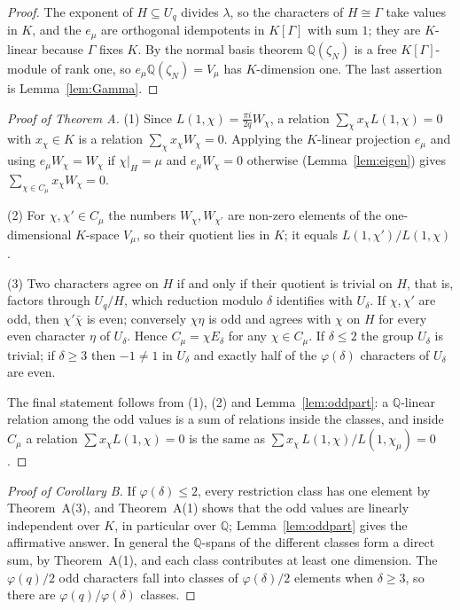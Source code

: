 \documentclass[11pt]{amsart}
\theoremstyle{definition}
\theoremstyle{remark}
\providecommand{\Q}{\mathbb Q}
\numberwithin{equation}{section}
\begin{document}
\begin{proof}
The exponent of $H\subseteq U_q$ divides $\lambda$, so the characters of $H\cong\Gamma$ take values in $K$, and the $e_\mu$ are orthogonal idempotents in $K[\Gamma]$ with sum $1$; they are $K$-linear because $\Gamma$ fixes $K$.
By the normal basis theorem $\Q(\zeta_N)$ is a free $K[\Gamma]$-module of rank one, so $e_\mu\Q(\zeta_N)=V_\mu$ has $K$-dimension one.
The last assertion is Lemma~\ref{lem:Gamma}.
\end{proof}

\begin{proof}[Proof of Theorem A]
(1) Since $L(1,\chi)=\frac{\pi i}{2q}W_\chi$, a relation $\sum_\chi x_\chi L(1,\chi)=0$ with $x_\chi\in K$ is a relation $\sum_\chi x_\chi W_\chi=0$.
Applying the $K$-linear projection $e_\mu$ and using $e_\mu W_\chi=W_\chi$ if $\chi|_H=\mu$ and $e_\mu W_\chi=0$ otherwise (Lemma~\ref{lem:eigen}) gives $\sum_{\chi\in C_\mu}x_\chi W_\chi=0$.

(2) For $\chi,\chi'\in C_\mu$ the numbers $W_\chi,W_{\chi'}$ are non-zero elements of the one-dimensional $K$-space $V_\mu$, so their quotient lies in $K$; it equals $L(1,\chi')/L(1,\chi)$.

(3) Two characters agree on $H$ if and only if their quotient is trivial on $H$, that is, factors through $U_q/H$, which reduction modulo $\delta$ identifies with $U_\delta$.
If $\chi,\chi'$ are odd, then $\chi'\bar\chi$ is even; conversely $\chi\eta$ is odd and agrees with $\chi$ on $H$ for every even character $\eta$ of $U_\delta$.
Hence $C_\mu=\chi E_\delta$ for any $\chi\in C_\mu$.
If $\delta\le2$ the group $U_\delta$ is trivial; if $\delta\ge3$ then $-1\neq1$ in $U_\delta$ and exactly half of the $\varphi(\delta)$ characters of $U_\delta$ are even.

The final statement follows from (1), (2) and Lemma~\ref{lem:oddpart}: a $\Q$-linear relation among the odd values is a sum of relations inside the classes, and inside $C_\mu$ a relation $\sum x_\chi L(1,\chi)=0$ is the same as $\sum x_\chi\,L(1,\chi)/L(1,\chi_\mu)=0$.
\end{proof}

\begin{proof}[Proof of Corollary B]
If $\varphi(\delta)\le2$, every restriction class has one element by Theorem~A(3), and Theorem~A(1) shows that the odd values are linearly independent over $K$, in particular over $\Q$; Lemma~\ref{lem:oddpart} gives the affirmative answer.
In general the $\Q$-spans of the different classes form a direct sum, by Theorem~A(1), and each class contributes at least one dimension.
The $\varphi(q)/2$ odd characters fall into classes of $\varphi(\delta)/2$ elements when $\delta\ge3$, so there are $\varphi(q)/\varphi(\delta)$ classes.
\end{proof}
\end{document}
